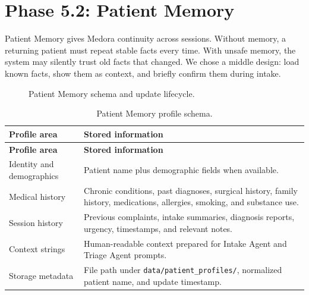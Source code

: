 \section{Phase 5.2: Patient Memory}

Patient Memory gives Medora continuity across sessions. Without memory, a returning patient must repeat stable facts every time. With unsafe memory, the system may silently trust old facts that changed. We chose a middle design: load known facts, show them as context, and briefly confirm them during intake.

\begin{figure}[htbp]
\centering
{}
\caption{Patient Memory schema and update lifecycle.}
\label{fig:patient_memory}
\end{figure}

\begin{longtable}{p{} p{}}
\caption{Patient Memory profile schema.}
\label{tab:patient_memory_schema}\\
\toprule
\textbf{Profile area} & \textbf{Stored information}\\
\midrule
\endfirsthead
\toprule
\textbf{Profile area} & \textbf{Stored information}\\
\midrule
\endhead
Identity and demographics & Patient name plus demographic fields when available.\\
Medical history & Chronic conditions, past diagnoses, surgical history, family history, medications, allergies, smoking, and substance use.\\
Session history & Previous complaints, intake summaries, diagnosis reports, urgency, timestamps, and relevant notes.\\
Context strings & Human-readable context prepared for Intake Agent and Triage Agent prompts.\\
Storage metadata & File path under \texttt{data/patient\_profiles/}, normalized patient name, and update timestamp.\\
\bottomrule
\end{longtable}

